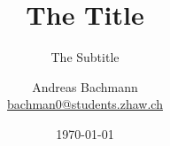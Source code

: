 \documentclass[
	final,
	a4paper,
	oneside,
	parskip=full,
	headings=standardclasses,
	headings=big,
	pointednumbers
]{scrartcl}
\title{The Title}
\subtitle{The Subtitle}
\author{Andreas Bachmann \\ \href{mailto:bachman0@students.zhaw.ch}{bachman0@students.zhaw.ch}}
\date{\today}
\begin{document}
	\layout
\end{document}
